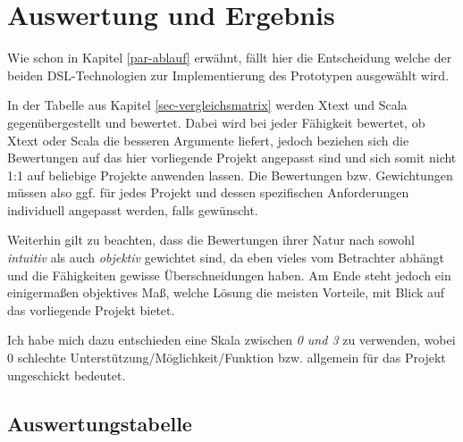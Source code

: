 \section{Auswertung und Ergebnis}

Wie schon in Kapitel \ref{par-ablauf} erwähnt,
  fällt hier die Entscheidung welche der beiden
  DSL-Technologien zur Implementierung des Prototypen ausgewählt wird.

In der Tabelle aus Kapitel \ref{sec-vergleichsmatrix} werden Xtext und
Scala gegenübergestellt und bewertet.
Dabei wird bei jeder Fähigkeit bewertet,
  ob Xtext oder Scala die besseren Argumente liefert,
  jedoch beziehen sich die Bewertungen auf das hier vorliegende Projekt
angepasst sind und sich somit nicht 1:1 auf beliebige Projekte anwenden lassen.
Die Bewertungen bzw. Gewichtungen müssen also ggf. für jedes Projekt und dessen
spezifischen Anforderungen individuell angepasst werden, falls gewünscht.

Weiterhin gilt zu beachten, dass die Bewertungen ihrer Natur nach sowohl
\emph{intuitiv} als auch \emph{objektiv} gewichtet sind, da eben vieles vom
Betrachter abhängt und die Fähigkeiten gewisse Überschneidungen haben.
Am Ende steht jedoch ein einigermaßen objektives Maß,
welche Lösung die meisten Vorteile, mit Blick
auf das vorliegende Projekt bietet.

Ich habe mich dazu entschieden eine Skala zwischen \emph{0 und 3} zu verwenden,
wobei 0 schlechte Unterstützung/Möglichkeit/Funktion bzw.
allgemein für das Projekt ungeschickt bedeutet.


\subsection{Auswertungstabelle}\label{sec-auswertungstabelle}

